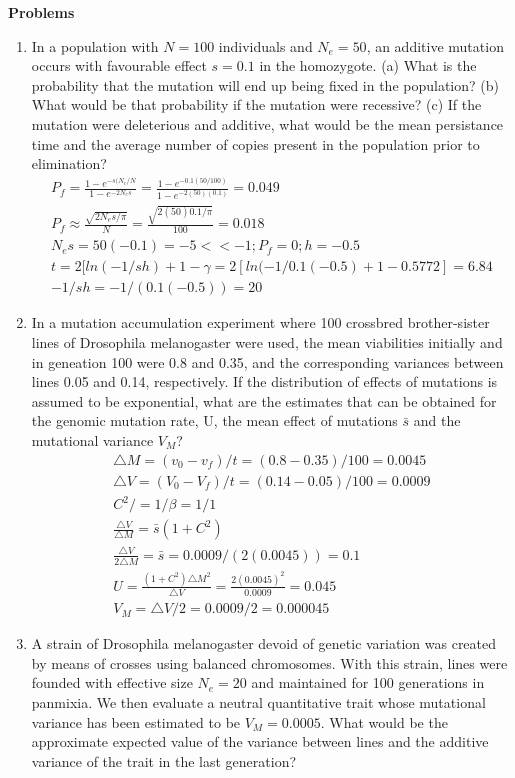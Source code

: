 \documentclass[12pt]{amsart}
\begin{document}
{\large \bf Problems}   
\begin{enumerate}
\item In a population with $N = 100$ individuals and $N_e = 50$, an additive mutation occurs with favourable effect $s = 0.1$ in the homozygote. (a) What is the probability that the mutation will end up being fixed in the population? (b) What would be that probability if the mutation were recessive? (c) If the mutation were deleterious and additive, what would be the mean persistance time and the average number of copies present in the population prior to elimination? 
\begin{gather*}
P_f = \frac{1 - e^{-s(N_e/N}}{1-e^{-2N_es}} = \frac{1 - e^{-0.1(50/100)}}{1-e^{-2(50)(0.1)}} = 0.049 \\
P_f \approx \frac{\sqrt{2N_es/\pi}}{N} = \frac{\sqrt{2(50)0.1/\pi}}{100} = 0.018\\
N_es = 50(-0.1) = -5 << -1 ; P_f = 0 ; h = -0.5 \\ 
t = 2[ln(-1/sh)+1-\gamma = 2[ln(-1/0.1(-0.5) + 1 - 0.5772] = 6.84 \\
-1/sh = -1/(0.1(-0.5)) = 20
\end{gather*}
\item In a mutation accumulation experiment where 100 crossbred brother-sister lines of Drosophila melanogaster were used, the mean viabilities initially and in geneation 100 were 0.8 and 0.35, and the corresponding variances between lines 0.05 and 0.14, respectively. If the distribution of effects of mutations is assumed to be exponential, what are the estimates that can be obtained for the genomic mutation rate, U, the mean effect of mutations $\bar{s}$ and the mutational variance $V_M$? \\
\begin{gather*}
\triangle M = (v_0 - v_f)/t = (0.8 - 0.35)/100 = 0.0045\\
\triangle V = (V_0 - V_f)/t = (0.14-0.05)/100 = 0.0009\\
C^2/ = 1/\beta = 1/1\\
\frac{\triangle V }{\triangle M} = \bar{s}(1 + C^2) \\
\frac{\triangle V }{2\triangle M} = \bar{s} = 0.0009/(2(0.0045)) = 0.1\\
U = \frac{(1+C^2)\triangle M^2}{\triangle V} = \frac{2(0.0045)^2}{0.0009}=0.045\\
V_M = \triangle V /2 = 0.0009 /2 = 0.000045    
\end{gather*}
\item A strain of Drosophila melanogaster devoid of genetic variation was created by means of crosses using balanced chromosomes. With this strain, lines were founded with effective size $N_e = 20$ and maintained for 100 generations in panmixia. We then evaluate a neutral quantitative trait whose mutational variance has been estimated to be $V_M = 0.0005$. What would be the approximate expected value of the variance between lines and the additive variance of the trait in the last generation?

\end{enumerate}
\end{document}
